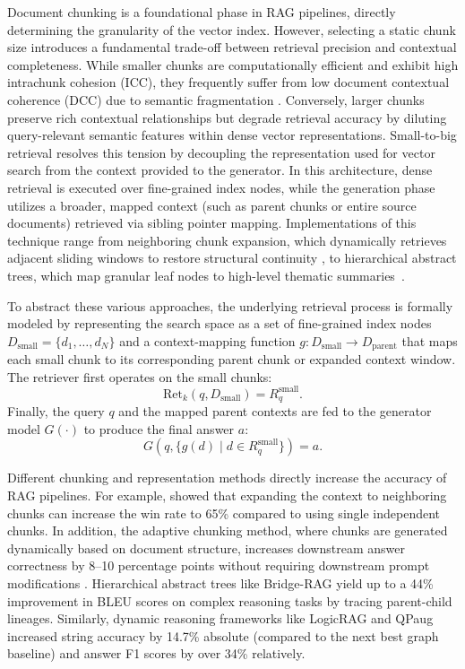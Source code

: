 Document chunking is a foundational phase in RAG pipelines, directly determining the granularity of the vector index. However, selecting a static chunk size introduces a fundamental trade-off between retrieval precision and contextual completeness. While smaller chunks are computationally efficient and exhibit high intrachunk cohesion (ICC), they frequently suffer from low document contextual coherence (DCC) due to semantic fragmentation \citep{demourajunior2026adaptive}. Conversely, larger chunks preserve rich contextual relationships but degrade retrieval accuracy by diluting query-relevant semantic features within dense vector representations. Small-to-big retrieval resolves this tension by decoupling the representation used for vector search from the context provided to the generator. In this architecture, dense retrieval is executed over fine-grained index nodes, while the generation phase utilizes a broader, mapped context (such as parent chunks or entire source documents) retrieved via sibling pointer mapping. Implementations of this technique range from neighboring chunk expansion, which dynamically retrieves adjacent sliding windows to restore structural continuity \citep{lumer2026rethinking}, to hierarchical abstract trees, which map granular leaf nodes to high-level thematic summaries~\citep{li2026bridgerag}.

To abstract these various approaches, the underlying retrieval process is formally modeled by representing the search space as a set of fine-grained index nodes $D_{\text{small}} = \{d_1, \ldots, d_N\}$ and a context-mapping function $g: D_{\text{small}} \to D_{\text{parent}}$ that maps each small chunk to its corresponding parent chunk or expanded context window. The retriever first operates on the small chunks:
\begin{equation}
\text{Ret}_k(q, D_{\text{small}}) = R_q^{\text{small}}.
\end{equation}
Finally, the query $q$ and the mapped parent contexts are fed to the generator model $G(\cdot)$ to produce the final answer $a$:
\begin{equation}
G\left(q, \{ g(d) \mid d \in R_q^{\text{small}} \}\right) = a.
\end{equation}

Different chunking and representation methods directly increase the accuracy of RAG pipelines. For example, \citet{lumer2026rethinking} showed that expanding the context to neighboring chunks can increase the win rate to 65\% compared to using single independent chunks. In addition, the adaptive chunking method, where chunks are generated dynamically based on document structure, increases downstream answer correctness by 8--10 percentage points without requiring downstream prompt modifications \citep{demourajunior2026adaptive}. Hierarchical abstract trees like Bridge-RAG \citep{li2026bridgerag} yield up to a 44\% improvement in BLEU scores on complex reasoning tasks by tracing parent-child lineages. Similarly, dynamic reasoning frameworks like LogicRAG \citep{chen2026logicrag} and QPaug \citep{kim2024qpaug} increased string accuracy by 14.7\% absolute (compared to the next best graph baseline) and answer F1 scores by over 34\% relatively.

